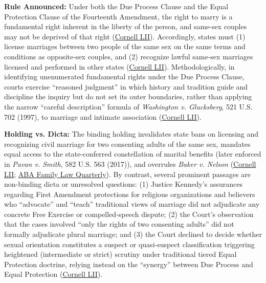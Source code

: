\documentclass[12pt]{article}
\begin{document}
\textbf{Rule Announced:} Under both the Due Process Clause and the Equal Protection Clause of the Fourteenth Amendment, the right to marry is a fundamental right inherent in the liberty of the person, and same-sex couples may not be deprived of that right (\href{https://www.law.cornell.edu/supremecourt/text/14-556}{Cornell LII}). Accordingly, states must (1) license marriages between two people of the same sex on the same terms and conditions as opposite-sex couples, and (2) recognize lawful same-sex marriages licensed and performed in other states (\href{https://www.law.cornell.edu/supremecourt/text/14-556}{Cornell LII}). Methodologically, in identifying unenumerated fundamental rights under the Due Process Clause, courts exercise ``reasoned judgment'' in which history and tradition guide and discipline the inquiry but do not set its outer boundaries, rather than applying the narrow ``careful description'' formula of \textit{Washington v. Glucksberg}, 521 U.S. 702 (1997), to marriage and intimate association (\href{https://www.law.cornell.edu/supremecourt/text/14-556}{Cornell LII}).

\textbf{Holding vs. Dicta:} The binding holding invalidates state bans on licensing and recognizing civil marriage for two consenting adults of the same sex, mandates equal access to the state-conferred constellation of marital benefits (later enforced in \textit{Pavan v. Smith}, 582 U.S. 563 (2017)), and overrules \textit{Baker v. Nelson} (\href{https://www.law.cornell.edu/supremecourt/text/14-556}{Cornell LII}; \href{https://www.americanbar.org/groups/family_law/resources/family-law-quarterly/2025-december/obergefell-victories-setbacks-protecting-rights-lgbtq-families/}{ABA Family Law Quarterly}). By contrast, several prominent passages are non-binding dicta or unresolved questions: (1) Justice Kennedy's assurances regarding First Amendment protections for religious organizations and believers who ``advocate'' and ``teach'' traditional views of marriage did not adjudicate any concrete Free Exercise or compelled-speech dispute; (2) the Court's observation that the cases involved ``only the rights of two consenting adults'' did not formally adjudicate plural marriage; and (3) the Court declined to decide whether sexual orientation constitutes a suspect or quasi-suspect classification triggering heightened (intermediate or strict) scrutiny under traditional tiered Equal Protection doctrine, relying instead on the ``synergy'' between Due Process and Equal Protection (\href{https://www.law.cornell.edu/supremecourt/text/14-556}{Cornell LII}).
\end{document}
